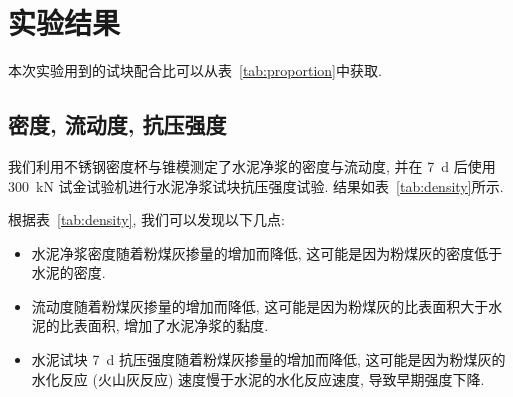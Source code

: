 
\section{实验结果}

本次实验用到的试块配合比可以从表~\ref{tab:proportion}中获取.

\subsection{密度, 流动度, 抗压强度}

我们利用不锈钢密度杯与锥模测定了水泥净浆的密度与流动度, 并在 \SI{7}{\day} 后使用 \SI{300}{\kilo\newton} 试金试验机进行水泥净浆试块抗压强度试验. 结果如表~\ref{tab:density}所示.

\begin{table}[!t]
  \centering
  \caption{水泥净浆密度, 流动度与水泥试块 \SI{7}{\day} 平均抗压强度实验结果}
  \label{tab:density}
\end{table}

根据表~\ref{tab:density}, 我们可以发现以下几点:
\begin{itemize}
  \item 水泥净浆密度随着粉煤灰掺量的增加而降低, 这可能是因为粉煤灰的密度低于水泥的密度.
  \item 流动度随着粉煤灰掺量的增加而降低, 这可能是因为粉煤灰的比表面积大于水泥的比表面积, 增加了水泥净浆的黏度.
  \item 水泥试块 \SI{7}{\day} 抗压强度随着粉煤灰掺量的增加而降低, 这可能是因为粉煤灰的水化反应 (火山灰反应) 速度慢于水泥的水化反应速度, 导致早期强度下降.
\end{itemize}

